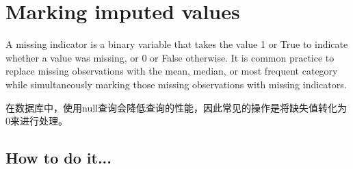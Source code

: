 \section{Marking imputed values}
A missing indicator is a binary variable that takes the value 1 or True to indicate whether a value was 
missing, or 0 or False otherwise. It is common practice to replace missing observations with the mean, median, or most frequent category while simultaneously marking those missing observations 
with missing indicators. 

在数据库中，使用null查询会降低查询的性能，因此常见的操作是将缺失值转化为0来进行处理。

\subsection{How to do it...}
